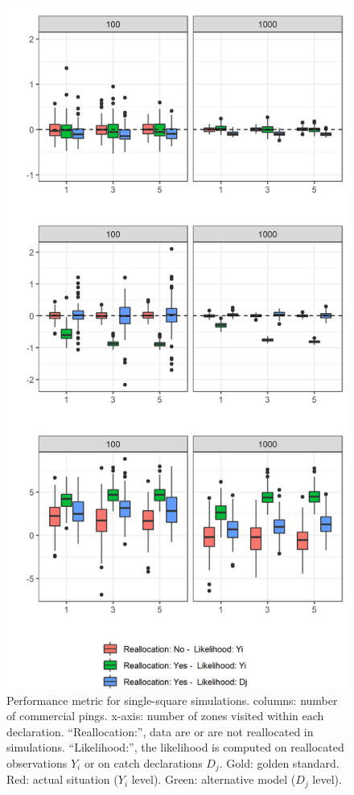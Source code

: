 \documentclass[
  english,
  man]{apa6}
\begin{document}
\begin{figure}
\centering
\includegraphics{images/Perf.metric_single_square.png}
\caption{\label{fig:PerfMetricSingle} Performance metric for single-square simulations. columns: number of commercial pings. x-axis: number of zones visited within each declaration. \enquote{Reallocation:}, data are or are not reallocated in simulations. \enquote{Likelihood:}, the likelihood is computed on reallocated observations \(Y_i\) or on catch declarations \(D_j\). Gold: golden standard. Red: actual situation (\(Y_i\) level). Green: alternative model (\(D_j\) level).}
\end{figure}
\end{document}
